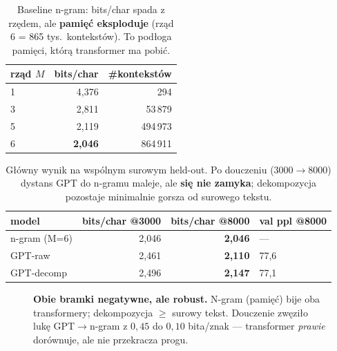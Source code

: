 \documentclass[11pt]{article}
\begin{document}
\begin{table}[h]
\centering
\begin{tabular}{lrr}
\toprule
rząd $M$ & bits/char & \#kontekstów \\
\midrule
1 & 4{,}376 & 294 \\
3 & 2{,}811 & 53\,879 \\
5 & 2{,}119 & 494\,973 \\
6 & \textbf{2{,}046} & 864\,911 \\
\bottomrule
\end{tabular}
\caption{Baseline n-gram: bits/char spada z rzędem, ale \textbf{pamięć eksploduje} (rząd 6 = 865 tys.\
kontekstów). To podłoga pamięci, którą transformer ma pobić.}
\end{table}

\begin{table}[h]
\centering
\begin{tabular}{lrrl}
\toprule
model & bits/char @3000 & bits/char @8000 & val ppl @8000 \\
\midrule
n-gram (M=6) & 2{,}046 & \textbf{2{,}046} & --- \\
GPT-raw      & 2{,}461 & \textbf{2{,}110} & 77{,}6 \\
GPT-decomp   & 2{,}496 & \textbf{2{,}147} & 77{,}1 \\
\bottomrule
\end{tabular}
\caption{Główny wynik na wspólnym surowym held-out. Po douczeniu (3000$\to$8000) dystans GPT do n-gramu maleje, ale
\textbf{się nie zamyka}; dekompozycja pozostaje minimalnie gorsza od surowego tekstu.}
\end{table}

\begin{figure}[h]
\centering
{}
\caption{\textbf{Obie bramki negatywne, ale robust.} N-gram (pamięć) bije oba transformery; dekompozycja $\geq$
surowy tekst. Douczenie zwęziło lukę GPT$\to$n-gram z $0{,}45$ do $0{,}10$ bita/znak --- transformer \emph{prawie}
dorównuje, ale nie przekracza progu.}
\end{figure}
\end{document}
